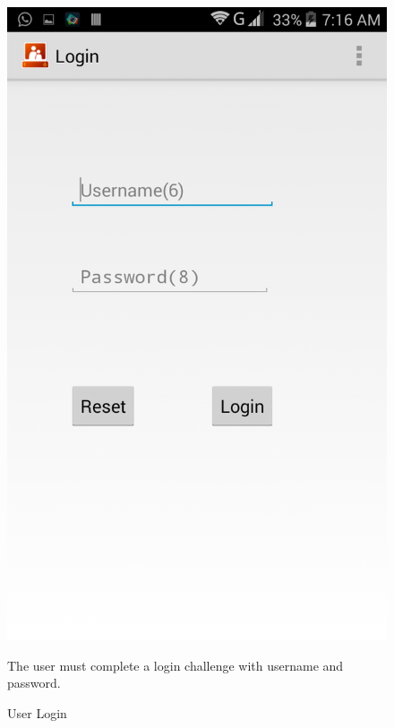 \begin{figure}
\begin{center}
\scalebox{0.25}
{\includegraphics{login.png}}
\caption{User Login}  
\end{center}
The user must complete a login challenge with username and password.
\end{figure}

